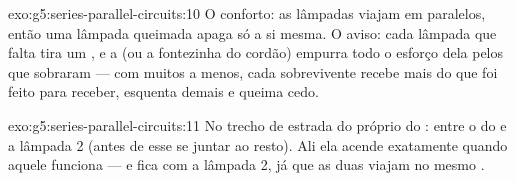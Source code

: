 \begin{solution}{exo:g5:series-parallel-circuits:10}
O conforto: as lâmpadas viajam em  paralelos, então uma lâmpada
queimada apaga só a si mesma. O aviso: cada lâmpada que falta tira um
, e a  (ou a fontezinha do cordão) empurra todo o esforço
dela pelos  que sobraram --- com muitos  a menos, cada
sobrevivente recebe mais do que foi feito para receber, esquenta
demais e queima cedo.
\end{solution}

\begin{solution}{exo:g5:series-parallel-circuits:11}
No trecho de estrada do próprio  do : entre o
 do  e a lâmpada 2 (antes de esse  se juntar ao
resto). Ali ela acende exatamente quando aquele  funciona --- e
fica  com a lâmpada 2, já que as duas viajam no mesmo .
\end{solution}

